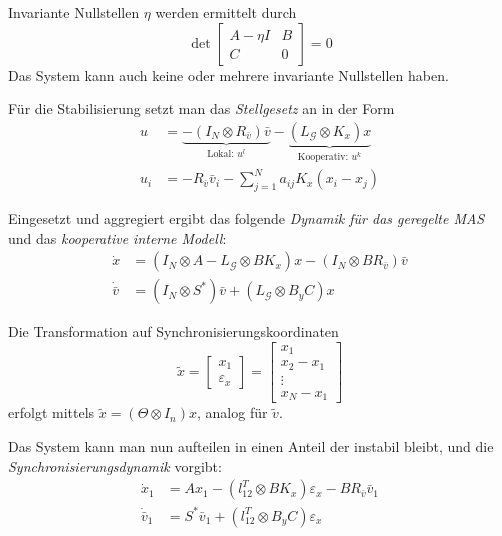 Invariante Nullstellen $\eta$ werden ermittelt durch
\begin{equation}
    \det \begin{bmatrix}
        A-\eta I & B \\
        C & 0
    \end{bmatrix} = 0
\end{equation}
Das System kann auch keine oder mehrere invariante Nullstellen haben.

Für die Stabilisierung setzt man das \emph{Stellgesetz} an in der Form
\begin{align}
    u&=\underbrace{-(I_N \otimes R_{\bar{v}})\bar{v}}_{\text{Lokal: }u^l} - \underbrace{(L_{\mathcal{G}} \otimes K_x)x}_{\text{Kooperativ: }u^k} \\
    u_i &= -R_{\bar{v}} \bar{v}_i - \sum_{j=1}^N a_{ij}K_x (x_i -x_j)
\end{align}

Eingesetzt und aggregiert ergibt das folgende \emph{Dynamik für das geregelte MAS} und das
\emph{kooperative interne Modell}:
\begin{align}
    \dot{x} &= (I_N \otimes A - L_{\mathcal{G}} \otimes BK_x) x - (I_N \otimes BR_{\bar{v}})\bar{v} \\
    \dot{\bar{v}} &= (I_N \otimes S^*)\bar{v} + (L_{\mathcal{G}}\otimes B_y C)x
\end{align}

Die Transformation auf Synchronisierungskoordinaten
\begin{equation}
    \tilde{x}=\begin{bmatrix}
        x_1 \\
        \varepsilon_x
    \end{bmatrix}
    = \begin{bmatrix}
        x_1 \\ x_2-x_1 \\ \vdots \\ x_N-x_1
    \end{bmatrix}
\end{equation}
erfolgt mittels $\tilde{x}=(\Theta \otimes I_n)x$, analog für $\tilde{v}$.


Das System kann man nun aufteilen in einen Anteil der instabil bleibt, und die
\emph{Synchronisierungsdynamik} vorgibt:
\begin{align}
    \dot{x}_1 &= Ax_1 - (l_{12}^T \otimes BK_x)\varepsilon_x - BR_{\bar{v}}\bar{v}_1 \\
    \dot{\bar{v}}_1 &= S^*\bar{v}_1 + (l_{12}^T \otimes B_y C)\varepsilon_x
\end{align}

